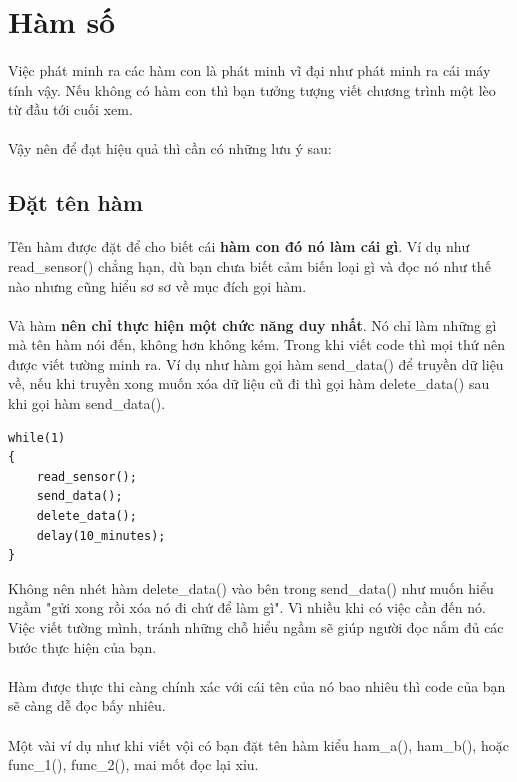 \documentclass[12pt,a5paper]{book}
\begin{document}
\section{Hàm số}
\paragraph{}
Việc phát minh ra các hàm con là phát minh vĩ đại như phát minh ra cái máy tính vậy. Nếu không có hàm con thì bạn tưởng tượng viết chương trình một lèo từ đầu tới cuối xem.
\paragraph{}
Vậy nên để đạt hiệu quả thì cần có những lưu ý sau:
\subsection{Đặt tên hàm}
\paragraph{}
Tên hàm được đặt để cho biết cái \textbf{hàm con đó nó làm cái gì}. Ví dụ như read\_sensor() chẳng hạn, dù bạn chưa biết cảm biến loại gì và đọc nó như thế nào nhưng cũng hiểu sơ sơ về mục đích gọi hàm.
\paragraph{}
Và hàm \textbf{nên chỉ thực hiện một chức năng duy nhất}. Nó chỉ làm những gì mà tên hàm nói đến, không hơn không kém. Trong khi viết code thì mọi thứ nên được viết tường minh ra. Ví dụ như hàm gọi hàm send\_data() để truyền dữ liệu về, nếu khi truyền xong muốn xóa dữ liệu cũ đi thì gọi hàm delete\_data() sau khi gọi hàm send\_data().
\begin{lstlisting}
while(1)
{
	read_sensor();
	send_data();
	delete_data();
	delay(10_minutes);
}
\end{lstlisting}
Không nên nhét hàm delete\_data() vào bên trong send\_data() như muốn hiểu ngầm "gửi xong rồi xóa nó đi chứ để làm gì". Vì nhiều khi có việc cần đến nó. Việc viết tường mình, tránh những chỗ hiểu ngầm sẽ giúp người đọc nắm đủ các bước thực hiện của bạn. 
\paragraph{}
Hàm được thực thi càng chính xác với cái tên của nó bao nhiêu thì code của bạn sẽ càng dễ đọc bấy nhiêu. 
\paragraph{}
Một vài ví dụ như khi viết vội có bạn đặt tên hàm kiểu ham\_a(), ham\_b(), hoặc func\_1(), func\_2(), mai mốt đọc lại xỉu.
\end{document}
